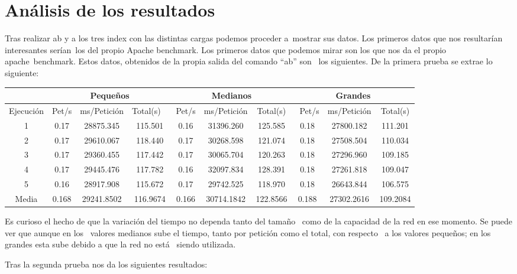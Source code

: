 \documentclass[11pt,twoside,a4paper]{book}
\begin{document}
\section{Análisis de los resultados}
Tras realizar ab y a los tres index con las distintas cargas podemos proceder a\
mostrar sus datos. Los primeros datos que nos resultarían interesantes serían\
los del propio Apache benchmark.
Los primeros datos que podemos mirar son los que nos da el propio apache\
benchmark. Estos datos, obtenidos de la propia salida del comando “ab” son \
los siguientes. De la primera prueba se extrae lo siguiente:

\begin{center}
\small
\begin{tabular}{ |c|c|c|c|c|c|c|c|c|c| }
 \hline
  & \multicolumn{3}{|c}{Pequeños} & \multicolumn{3}{|c|}{Medianos} & \multicolumn{3}{|c|}{Grandes} \\
 \hline
 Ejecución & Pet/s & ms/Petición & Total(s) \
 & Pet/s & ms/Petición & Total(s) &\
 Pet/s & ms/Petición & Total(s) \\
 \hline
 1 & 0.17 & 28875.345 & 115.501 & 0.16 & 31396.260 & 125.585 & 0.18 & 27800.182 & 111.201 \\
 \hline
 2 & 0.17 & 29610.067 & 118.440 & 0.17 & 30268.598 & 121.074 & 0.18 & 27508.504 & 110.034 \\
 \hline
 3 & 0.17 & 29360.455 & 117.442 & 0.17 & 30065.704 & 120.263 & 0.18 & 27296.960 & 109.185 \\
 \hline
 4 & 0.17 & 29445.476 & 117.782 & 0.16 & 32097.834 & 128.391 & 0.18 & 27261.818 & 109.047 \\
 \hline
 5 & 0.16 & 28917.908 & 115.672 & 0.17 & 29742.525 & 118.970 & 0.18 & 26643.844 & 106.575 \\
 \hline
 Media & 0.168 & 29241.8502 & 116.9674 & 0.166 & 30714.1842 & 122.8566 & 0.188 & 27302.2616 & 109.2084 \\
 \hline
\end{tabular}
\end{center}

Es curioso el hecho de que la variación del tiempo no dependa tanto del tamaño \
como de la capacidad de la red en ese momento. Se puede ver que aunque en los \
valores medianos sube el tiempo, tanto por petición como el total, con respecto \
a los valores pequeños; en los grandes esta sube debido a que la red no está \
siendo utilizada. \newline

Tras la segunda prueba nos da los siguientes resultados:
\end{document}
